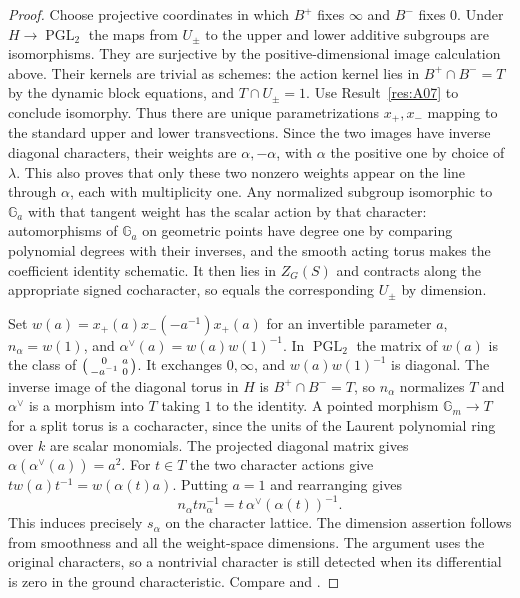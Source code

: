 \documentclass[11pt,a4paper,openany,oneside]{book}
\theoremstyle{resultstyle}
\theoremstyle{definition}
\numberwithin{equation}{chapter}
\newcommand{\Gm}{\mathbb{G}_m}
\newcommand{\Ga}{\mathbb{G}_a}
\begin{document}
\begin{proof}
Choose projective coordinates in which \(B^+\) fixes
\(\infty\) and \(B^-\) fixes \(0\).
Under \(H\to\operatorname{PGL}_2\) the maps from \(U_\pm\)
to the upper and lower additive subgroups are isomorphisms.
They are surjective by the positive-dimensional image
calculation above. Their kernels are trivial as schemes:
the action kernel lies in \(B^+\cap B^-=T\) by the dynamic
block equations, and \(T\cap U_\pm=1\).
Use Result~\ref{res:A07} to conclude isomorphy.
Thus there are unique parametrizations \(x_+,x_-\)
mapping to the standard upper and lower transvections.
Since the two images have inverse diagonal characters, their
weights are \(\alpha,-\alpha\), with \(\alpha\) the positive
one by choice of \(\lambda\). This also proves that only
these two nonzero weights appear on the line through \(\alpha\),
each with multiplicity one. Any normalized subgroup isomorphic
to \(\Ga\) with that tangent weight has the scalar action
by that character: automorphisms of \(\Ga\) on geometric
points have degree one by comparing polynomial degrees
with their inverses, and the smooth acting torus makes the
coefficient identity schematic. It then lies in \(Z_G(S)\)
and contracts along the appropriate signed cocharacter,
so equals the corresponding \(U_\pm\) by dimension.

Set \(w(a)=x_+(a)x_-(-a^{-1})x_+(a)\) for an invertible
parameter \(a\), \(n_\alpha=w(1)\), and
\(\alpha^\vee(a)=w(a)w(1)^{-1}\).
In \(\operatorname{PGL}_2\) the matrix of \(w(a)\) is
the class of
\(\begin{psmallmatrix}0&a\\-a^{-1}&0\end{psmallmatrix}\).
It exchanges \(0,\infty\), and
\(w(a)w(1)^{-1}\) is diagonal.
The inverse image of the diagonal torus in \(H\) is
\(B^+\cap B^-=T\), so \(n_\alpha\) normalizes
\(T\) and \(\alpha^\vee\) is a morphism into \(T\) taking
\(1\) to the identity. A pointed morphism
\(\Gm\to T\) for a split torus is a cocharacter, since
the units of the Laurent polynomial ring over \(k\) are
scalar monomials. The projected diagonal matrix gives
\(\alpha(\alpha^\vee(a))=a^2\).
For \(t\in T\) the two character actions give
\(t w(a)t^{-1}=w(\alpha(t)a)\).
Putting \(a=1\) and rearranging gives
\[
 n_\alpha t n_\alpha^{-1}
   =t\,\alpha^\vee(\alpha(t))^{-1}.
\]
This induces precisely \(s_\alpha\) on the character lattice.
The dimension assertion follows from smoothness and all the
weight-space dimensions. The argument uses the original
characters, so a nontrivial character is still detected when
its differential is zero in the ground characteristic.
Compare \cite[Chapters 20--21]{milne}
and \cite[Sections 2.1--2.2]{conradfeng}.
\end{proof}
\end{document}

